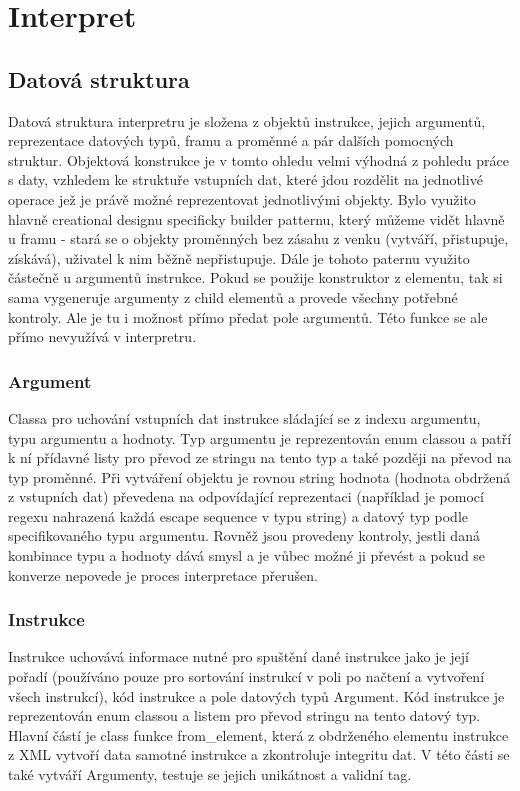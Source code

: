 \section{Interpret}


\subsection{Datová struktura}

Datová struktura interpretru je složena z objektů instrukce, jejich argumentů, reprezentace datových typů, framu a proměnné a pár dalších pomocných struktur.
Objektová konstrukce je v tomto ohledu velmi výhodná z pohledu práce s daty, vzhledem ke struktuře vstupních dat, které jdou rozdělit na jednotlivé operace jež je právě možné reprezentovat jednotlivými objekty.
Bylo využito hlavně creational designu specificky builder patternu, který můžeme vidět hlavně u framu - stará se o objekty proměnných bez zásahu z venku (vytváří, přistupuje, získává), uživatel k nim běžně nepřistupuje.
Dále je tohoto paternu využito částečně u argumentů instrukce. Pokud se použije konstruktor z elementu, tak si sama vygeneruje argumenty z child elementů a provede všechny potřebné kontroly.
Ale je tu i možnost přímo předat pole argumentů. Této funkce se ale přímo nevyužívá v interpretru.

\subsubsection{Argument}
Classa pro uchování vstupních dat instrukce sládající se z indexu argumentu, typu argumentu a hodnoty.
Typ argumentu je reprezentován enum classou a patří k ní přídavné listy pro převod ze stringu na tento typ a také později na převod na typ proměnné.
Při vytváření objektu je rovnou string hodnota (hodnota obdržená z vstupních dat) převedena na odpovídající reprezentaci (například je pomocí regexu nahrazená každá escape sequence v typu string) a datový typ podle specifikovaného typu argumentu.
Rovněž jsou provedeny kontroly, jestli daná kombinace typu a hodnoty dává smysl a je vůbec možné ji převést a pokud se konverze nepovede je proces interpretace přerušen.

\subsubsection{Instrukce}
Instrukce uchovává informace nutné pro spuštění dané instrukce jako je její pořadí (používáno pouze pro sortování instrukcí v poli po načtení a vytvoření všech instrukcí),
kód instrukce a pole datových typů Argument.
Kód instrukce je reprezentován enum classou a listem pro převod stringu na tento datový typ.
Hlavní částí je class funkce from\_element, která z obdrženého elementu instrukce z XML vytvoří data samotné instrukce a zkontroluje integritu dat.
V této části se také vytváří Argumenty, testuje se jejich unikátnost a validní tag. 

